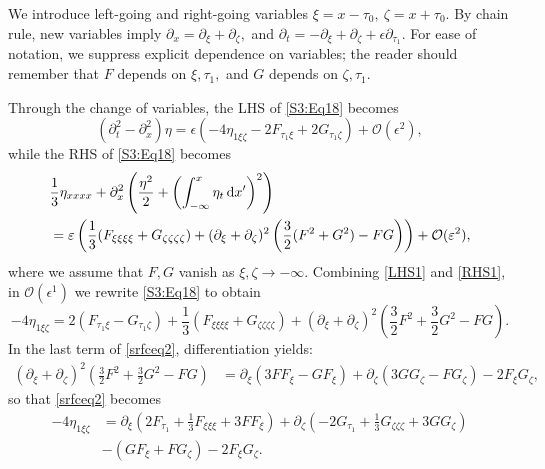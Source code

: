 We introduce left-going and right-going variables $\xi = x-\tau_0,~ \zeta = x+ \tau_0.$ By chain rule, new variables imply $\partial_x = \partial_\xi + \partial_\zeta,$ and $\partial_t =- \partial_\xi + \partial_\zeta + \epsilon \partial_{\tau_1}.$ For ease of notation, we suppress explicit dependence on variables; the reader should remember that $F$ depends on $\xi, \tau_1,$ and $G$ depends on $\zeta, \tau_1.$ 

Through the change of variables, the LHS of \eqref{S3:Eq18} becomes
\begin{equation}
(\partial_t^2 - \partial_x^2) \eta =  \epsilon \left(- 4\eta_{1\xi \zeta} - 2F_{\tau_1 \xi} + 2G_{\tau_1 \zeta} \right) + \mathcal{O}(\epsilon^2), \label{LHS1}
\end{equation}
while the RHS of \eqref{S3:Eq18} becomes
\begin{equation}\label{RHS1}
\begin{aligned}
&\frac{1}{3}\eta_{xxxx} +  \partial_x^2 \left( \frac{\eta^2}{2} + \left( \int^{x}_{-\infty} \eta_t \,\mathrm{d} x' \right)^2\right) \\
&= \varepsilon \left( \frac{1}{3}(F_{\xi\xi\xi\xi} + G_{\zeta\zeta\zeta\zeta}) +  (\partial_\xi+ \partial_\zeta)^2 \left(\frac{3}{2} (F^2  + G^2) - FG \right)\right) + \mathcal{O}(\varepsilon^2), 
\end{aligned}
\end{equation}
where we assume that $F,G$ vanish as $\xi, \zeta \to -\infty.$ Combining \eqref{LHS1} and \eqref{RHS1}, in $\mathcal{O}(\epsilon^1)$ we rewrite \eqref{S3:Eq18} to obtain
\begin{equation}\label{srfceq2}
- 4\eta_{1\xi \zeta} = 2(F_{\tau_1 \xi} - G_{\tau_1 \zeta}) + \frac{1}{3}(F_{\xi\xi\xi\xi} + G_{\zeta\zeta\zeta\zeta}) + (\partial_\xi + \partial_\zeta)^2 \left(\frac{3}{2} F^2  + \frac{3}{2}G^2 - FG \right).
\end{equation}
In the last term of \eqref{srfceq2}, differentiation yields:
\begin{align*}
(\partial_\xi+ \partial_\zeta)^2 \left(\frac{3}{2} F^2  + \frac{3}{2}G^2 - FG\right) &= \partial_\xi(3 F F_\xi - G F_\xi) + \partial_\zeta(3 G G_\zeta - F G_\zeta) - 2 F_\xi G_\zeta,
\end{align*}
so that \eqref{srfceq2} becomes
\begin{equation}\label{srfceq3}
\begin{aligned}
- 4\eta_{1\xi \zeta} &= \partial_\xi(2F_{\tau_1} + \frac{1}{3}F_{\xi\xi\xi} + 3 F F_\xi) + \partial_\zeta(- 2G_{\tau_1} +  \frac{1}{3}G_{\zeta\zeta\zeta} + 3 G G_\zeta) \\
&- (G F_\xi  + F G_\zeta) - 2 F_\xi G_\zeta. 
\end{aligned}
\end{equation}
